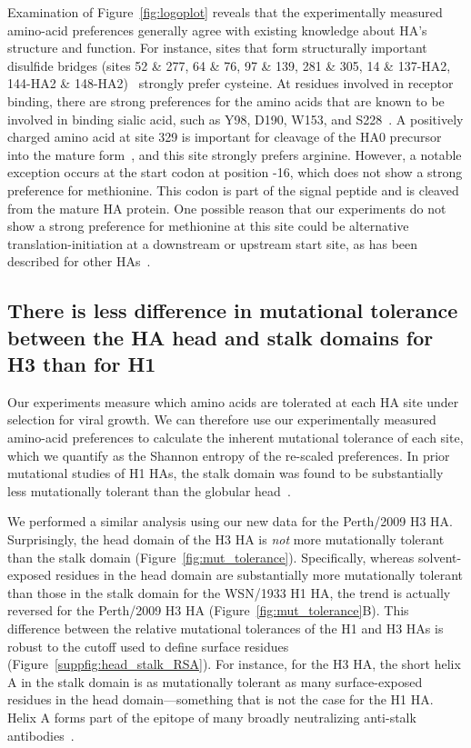 \documentclass[9pt,twocolumn,twoside]{pnas-new}
\begin{document}
Examination of Figure~\ref{fig:logoplot} reveals that the experimentally measured amino-acid preferences generally agree with existing knowledge about HA's structure and function.
For instance, sites that form structurally important disulfide bridges (sites 52 \& 277, 64 \& 76, 97 \& 139, 281 \& 305, 14 \& 137-HA2, 144-HA2 \& 148-HA2)~\cite{waterfield1981disulphide} strongly prefer cysteine.
At residues involved in receptor binding, there are strong preferences for the amino acids that are known to be involved in binding sialic acid, such as Y98, D190, W153, and S228~\cite{weis1988structure,martin1998studies,nobusawa2000change,yang2015structure}.
A positively charged amino acid at site 329 is important for cleavage of the HA0 precursor into the mature form~\cite{stech2005new}, and this site strongly prefers arginine.
However, a notable exception occurs at the start codon at position -16, which does not show a strong preference for methionine.
This codon is part of the signal peptide and is cleaved from the mature HA protein.
One possible reason that our experiments do not show a strong preference for methionine at this site could be alternative translation-initiation at a downstream or upstream start site, as has been described for other HAs~\cite{girard2011upstream}.

\subsection*{There is less difference in mutational tolerance between the HA head and stalk domains for H3 than for H1}
Our experiments measure which amino acids are tolerated at each HA site under selection for viral growth.
We can therefore use our experimentally measured amino-acid preferences to calculate the inherent mutational tolerance of each site, which we quantify as the Shannon entropy of the re-scaled preferences.
In prior mutational studies of H1 HAs, the stalk domain was found to be substantially less mutationally tolerant than the globular head~\cite{thyagarajan2014inherent,wu2014high,doud2016accurate,heaton2013genome}.

We performed a similar analysis using our new data for the Perth/2009 H3 HA.
Surprisingly, the head domain of the H3 HA is \emph{not} more mutationally tolerant than the stalk domain (Figure~\ref{fig:mut_tolerance}).
Specifically, whereas solvent-exposed residues in the head domain are substantially more mutationally tolerant than those in the stalk domain for the WSN/1933 H1 HA, the trend is actually reversed for the Perth/2009 H3 HA (Figure~\ref{fig:mut_tolerance}B).
This difference between the relative mutational tolerances of the H1 and H3 HAs is robust to the cutoff used to define surface residues (Figure~\ref{suppfig:head_stalk_RSA}).
For instance, for the H3 HA, the short helix A in the stalk domain is as mutationally tolerant as many surface-exposed residues in the head domain---something that is not the case for the H1 HA.
Helix A forms part of the epitope of many broadly neutralizing anti-stalk antibodies~\cite{mallajosyula2014influenza,laursen2013broadly,chai2016two}.
\end{document}
